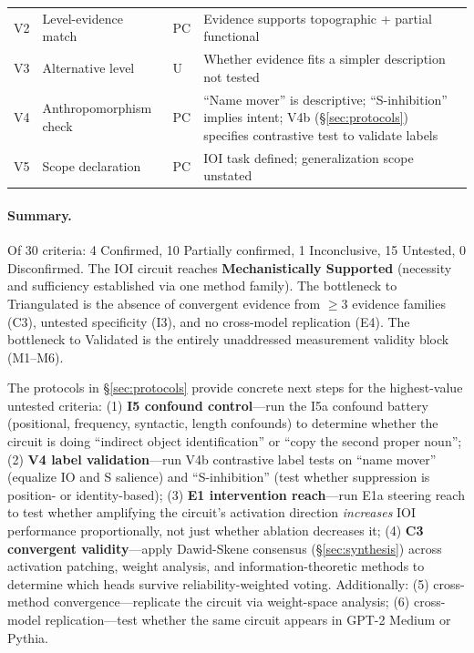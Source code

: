 \documentclass[10pt]{article}
\begin{document}
\begin{table}[H]
\begin{tabular}{@{}llll>{\raggedright\arraybackslash}p{6.5cm}@{}}
V2 & Level-evidence match & PC & Evidence supports topographic + partial functional \\
V3 & Alternative level & U & Whether evidence fits a simpler description not tested \\
V4 & Anthropomorphism check & PC & ``Name mover'' is descriptive; ``S-inhibition'' implies intent; V4b (\S\ref{sec:protocols}) specifies contrastive test to validate labels \\
V5 & Scope declaration & PC & IOI task defined; generalization scope unstated \\
\bottomrule
\end{tabular}
\end{table}

\paragraph{Summary.} Of 30 criteria: 4 Confirmed, 10 Partially confirmed, 1 Inconclusive, 15 Untested, 0 Disconfirmed. The IOI circuit reaches \textbf{Mechanistically Supported} (necessity and sufficiency established via one method family). The bottleneck to Triangulated is the absence of convergent evidence from $\geq 3$ evidence families (C3), untested specificity (I3), and no cross-model replication (E4). The bottleneck to Validated is the entirely unaddressed measurement validity block (M1--M6).

The protocols in \S\ref{sec:protocols} provide concrete next steps for the highest-value untested criteria: (1) \textbf{I5 confound control}---run the I5a confound battery (positional, frequency, syntactic, length confounds) to determine whether the circuit is doing ``indirect object identification'' or ``copy the second proper noun''; (2) \textbf{V4 label validation}---run V4b contrastive label tests on ``name mover'' (equalize IO and S salience) and ``S-inhibition'' (test whether suppression is position- or identity-based); (3) \textbf{E1 intervention reach}---run E1a steering reach to test whether amplifying the circuit's activation direction \emph{increases} IOI performance proportionally, not just whether ablation decreases it; (4) \textbf{C3 convergent validity}---apply Dawid-Skene consensus (\S\ref{sec:synthesis}) across activation patching, weight analysis, and information-theoretic methods to determine which heads survive reliability-weighted voting. Additionally: (5) cross-method convergence---replicate the circuit via weight-space analysis; (6) cross-model replication---test whether the same circuit appears in GPT-2 Medium or Pythia.
\end{document}
